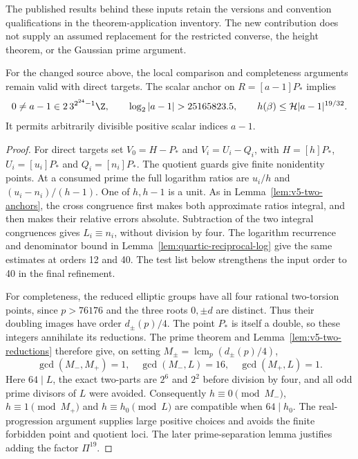 The published results behind these inputs retain the versions and
convention qualifications in the theorem-application inventory. The new
contribution does not supply an assumed replacement for the restricted
converse, the height theorem, or the Gaussian prime argument.

\begin{lemma}\label{lem:v9-bridge}
For the changed source above, the local comparison and completeness
arguments remain valid with direct targets. The scalar anchor on
$R=[a-1]P_*$ implies
\[
 0\ne a-1\in2\,3^{2^{24}-1}\Z,
 \qquad \log_2|a-1|>25165823.5,
 \qquad h(\beta)\le\mathcal H|a-1|^{19/32}.
\]
It permits arbitrarily divisible positive scalar indices $a-1$.
\end{lemma}
\begin{proof}
For direct targets set $V_0=H-P_*$ and $V_i=U_i-Q_i$, with
$H=[h]P_*$, $U_i=[u_i]P_*$ and $Q_i=[n_i]P_*$. The quotient guards
give finite nonidentity points. At a consumed prime the full logarithm
ratios are $u_i/h$ and $(u_i-n_i)/(h-1)$. One of $h,h-1$ is a unit.
As in Lemma~\ref{lem:v5-two-anchors}, the cross congruence first makes
both approximate ratios integral, and then makes their relative
errors absolute. Subtraction of the two integral congruences gives
$L_i\equiv n_i$, without division by four. The logarithm recurrence
and denominator bound in Lemma~\ref{lem:quartic-reciprocal-log} give
the same estimates at orders 12 and 40. The test list below strengthens
the input order to 40 in the final refinement.

For completeness, the reduced elliptic groups have all four rational
two-torsion points, since $p>76176$ and the three roots $0,\pm d$
are distinct. Thus their doubling images have order $d_\pm(p)/4$.
The point $P_*$ is itself a double, so these integers annihilate its
reductions. The prime theorem and Lemma~\ref{lem:v5-two-reductions}
therefore give, on setting $M_\pm=\operatorname{lcm}_p(d_\pm(p)/4)$,
\[
 \gcd(M_-,M_+)=1,\quad\gcd(M_-,L)=16,\quad\gcd(M_+,L)=1.
\]
Here $64\mid L$, the exact two-parts are $2^6$ and $2^2$ before
division by four, and all odd prime divisors of $L$ were avoided.
Consequently $h\equiv0\pmod{M_-}$, $h\equiv1\pmod{M_+}$ and
$h\equiv h_0\pmod L$ are compatible when $64\mid h_0$.
The real-progression argument supplies large positive choices and
avoids the finite forbidden point and quotient loci. The later
prime-separation lemma justifies adding the factor $\Pi^{19}$.


\end{proof}
